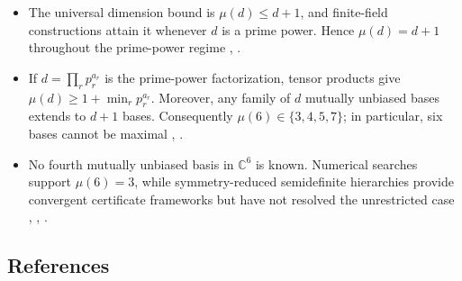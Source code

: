 \begin{itemize}
  \item The universal dimension bound is $\mu(d)\leq d+1$, and finite-field
  constructions attain it whenever $d$ is a prime power.  Hence
  $\mu(d)=d+1$ throughout the prime-power regime
  ,
  .

  \item If $d=\prod_r p_r^{a_r}$ is the prime-power factorization, tensor
  products give $\mu(d)\geq1+\min_r p_r^{a_r}$.  Moreover, any family of $d$
  mutually unbiased bases extends to $d+1$ bases.  Consequently
  $\mu(6)\in\{3,4,5,7\}$; in particular, six bases cannot be maximal
  ,
  .

  \item No fourth mutually unbiased basis in $\mathbb C^6$ is known.
  Numerical searches support $\mu(6)=3$, while symmetry-reduced
  semidefinite hierarchies provide convergent certificate frameworks but have
  not resolved the unrestricted case
  ,
  ,
  .

\end{itemize}

\subsection*{References}

